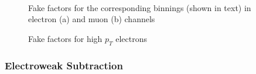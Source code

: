 \begin{figure}[ht]
       \centering
        \\
       \caption{Fake factors for the corresponding binnings (shown in text) in electron (a) and muon (b) channels}
       \label{fig:fakefactor}
\end{figure}

\begin{figure}[ht]
       \centering
       \caption{Fake factors for high $p_T$ electrons}
       \label{fig:fakefactor_el_highPt}
\end{figure}


\subsubsection*{Electroweak Subtraction}


